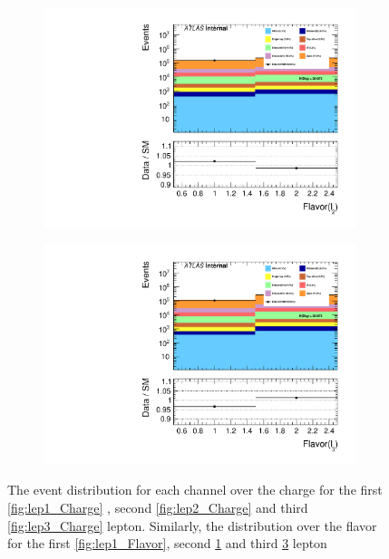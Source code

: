 \begin{figure}
{\begin{subfigure}{.425\textwidth}
        \includegraphics[width=\textwidth]{Figures/FeaturesHistograms/lep2_Flavor.pdf}
        \caption{}
        \label{fig:lep2_Flavor}
    \end{subfigure}
    \hfill
    \begin{subfigure}{.425\textwidth}
        \includegraphics[width=\textwidth]{Figures/FeaturesHistograms/lep3_Flavor.pdf}
        \caption{}
        \label{fig:lep3_Flavor}
    \end{subfigure}
    }
    \caption{The event distribution for each channel over the charge for the first \ref{fig:lep1_Charge}
    , second \ref{fig:lep2_Charge} and third \ref{fig:lep3_Charge} lepton. Similarly, the distribution over the flavor
    for the first \ref{fig:lep1_Flavor}, second \ref{fig:lep2_Flavor} and third \ref{fig:lep3_Flavor} lepton}
\end{figure}
